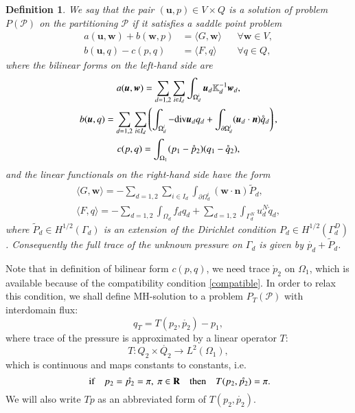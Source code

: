 \documentclass{elsarticle}
\newtheorem{definition}[thm]{Definition}
\def\div{{\rm div}}
\def\to{\rightarrow}
\def\Real{{\rm\bf R}}
\def\vc#1{\mathbf{\boldsymbol{#1}}}     %
\def\tn#1{{\mathbb{#1}}}    %
\def\vl{{\vc{u}}}
\def\mr{\mathring}
\begin{document}
\begin{definition}
\label{DefProblemP}
We say that the pair $(\vl,p)\in V\times Q$ is a solution of problem $P(\mathcal P)$ on the partitioning $\mathcal P$ if
it satisfies a saddle point problem
\begin{align}
        \label{SaddleP1}
 a(\vl,\vc w) + b(\vc w, p) &= \langle G, \vc w \rangle &&\forall \vc w\in V,\\
        \label{SaddleP2}
 b(\vl, q) - c(p,q) &= \langle F, q \rangle &&\forall q \in Q,
\end{align}
where the bilinear forms on the left-hand side are
\begin{gather*}
 a(\vc u,\vc w)=\sum_{d=1,2}\sum_{i\in I_d} \int_{\Omega_d^i} \vc u_d \tn K_d^{-1} \vc w_d,\\
 b(\vc u,q)=\sum_{d=1,2}\sum_{i\in I_d}\left( \int_{\Omega_d^i} -\div\vc u_d q_d
        +\int_{\partial\Omega_d^i} (\vc u_d\cdot\vc n) \mr{q}_d\right),\\
 c(p,q)=\int_{\Omega_1} (p_1-\mr{p}_2)(q_1-\mr{q}_2),
\end{gather*}
and the linear functionals on the right-hand side have the form
\begin{gather*}
 \langle G, \vc w \rangle = - \sum_{d=1,2}\sum_{i\in I_d}\int_{\partial\Omega_d^i} (\vc w\cdot\vc n) \tilde P_d,\\
 \langle F, q \rangle = -\sum_{d=1,2} \int_{\Omega_d} f_d q_d +\sum_{d=1,2} \int_{\Gamma_d^N} u^N_d \mr{q}_d,
\end{gather*} 
where $\tilde P_d\in H^{1/2}(\Gamma_d)$ is an extension of the Dirichlet condition $P_d\in H^{1/2}(\Gamma_d^D)$. Consequently the full trace of the unknown pressure on $\Gamma_d$ is given by $\mr{p_d}+\tilde P_d$.
\end{definition}
Note that in definition of bilinear form $c(p,q)$, we need trace $\mr{p}_2$ on $\Omega_1$,
which is available because of the compatibility condition \eqref{compatible}. In order to relax this condition, we shall define MH-solution to a problem $P_T(\mathcal P)$ with interdomain flux:
\[
   q_T= T(p_2,\mr{p_2}) - p_1,
\]
where trace of the pressure is approximated by a linear operator $T$:
\begin{equation} 
\label{OpT}
T: Q_2\times\mr{Q_2} \to L^2(\Omega_1),
\end{equation}
which is continuous and maps constants to constants, i.e.
\begin{equation}
\label{OpTconst} 
   \text{ if}\quad p_2=\mr{p_2}=\pi,\ \pi\in\Real\quad \text{then}\quad T(p_2,\mr{p_2})=\pi.
\end{equation}
We will also write $T p$ as an abbreviated form of $T(p_2,\mr{p_2})$.
\end{document}
